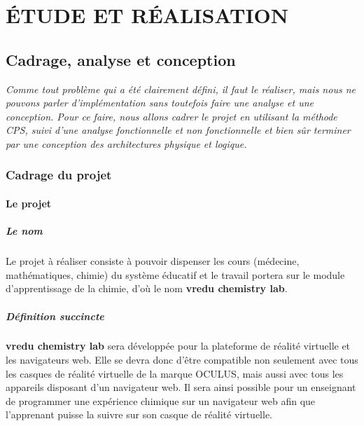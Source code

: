 \part{ÉTUDE ET RÉALISATION}

\chapter{Cadrage, analyse et conception}

\textit{Comme tout problème qui a été clairement défini, il faut le réaliser, mais nous ne pouvons
	parler d’implémentation sans toutefois faire une analyse et une conception. Pour ce faire,
	nous allons cadrer le projet en utilisant la méthode CPS, suivi d’une analyse
	fonctionnelle et non fonctionnelle et bien sûr terminer par une conception des architectures
	physique et logique.}

\clearpage

\section{Cadrage du projet}

\subsection{Le projet}

\subsubsection{Le nom}

Le projet à réaliser consiste à pouvoir dispenser les cours (médecine, mathématiques, chimie)
du système éducatif et le travail portera sur le module d’apprentissage de la chimie, d’où le
nom \textbf{vredu chemistry lab}.

\subsubsection{Définition succincte}

\textbf{vredu chemistry lab} sera développée pour la plateforme de réalité virtuelle et les navigateurs web. 
Elle se devra donc d’être compatible non seulement avec tous les casques de réalité virtuelle de la marque OCULUS, mais aussi avec tous les appareils disposant d’un navigateur web. 
Il sera ainsi possible pour un enseignant de programmer une expérience chimique sur un navigateur web afin que l'apprenant puisse la suivre sur son casque de réalité virtuelle.

